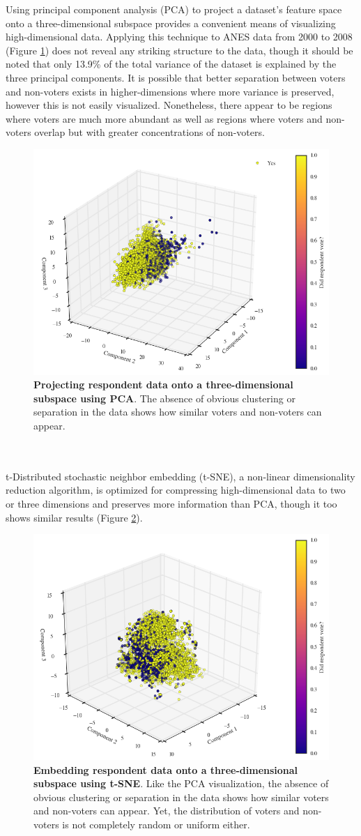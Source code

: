 \documentclass{article}
\begin{document}
	Using principal component analysis (PCA) to project a dataset's feature space onto a three-dimensional subspace provides a convenient means of visualizing high-dimensional data. Applying this technique to ANES data from 2000 to 2008 (Figure \ref{fig:pca}) does not reveal any striking structure to the data, though it should be noted that only 13.9\% of the total variance of the dataset is explained by the three principal components. It is possible that better separation between voters and non-voters exists in higher-dimensions where more variance is preserved, however this is not easily visualized.  Nonetheless, there appear to be regions where voters are much more abundant as well as regions where voters and non-voters overlap but with greater concentrations of non-voters.
	\begin{figure}[h!]
		\begin{center}
			\includegraphics*[width=0.45\linewidth]{pca}
			\caption{\textbf{Projecting respondent data onto a three-dimensional subspace using PCA}. The absence of obvious clustering or separation in the data shows how similar voters and non-voters can appear.}
			\label{fig:pca}
		\end{center}
	\end{figure}
	\hfill \\\\
	t-Distributed stochastic neighbor embedding (t-SNE), a non-linear dimensionality reduction algorithm, is optimized for compressing high-dimensional data to two or three dimensions and preserves more information than PCA, though it too shows similar results (Figure \ref{fig:tsne}).
	\begin{figure}[h!]
		\begin{center}
			\includegraphics*[width=0.45\linewidth]{tsne}
			\caption{\textbf{Embedding respondent data onto a three-dimensional subspace using t-SNE}. Like the PCA visualization, the absence of obvious clustering or separation in the data shows how similar voters and non-voters can appear. Yet, the distribution of voters and non-voters is not completely random or uniform either.}
			\label{fig:tsne}
		\end{center}
	\end{figure}
	\hfill \\\\
	
\end{document}
